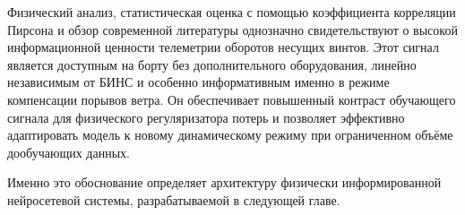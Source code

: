 Физический анализ, статистическая оценка с помощью коэффициента корреляции Пирсона и обзор современной литературы однозначно свидетельствуют о высокой информационной ценности телеметрии оборотов несущих винтов. Этот сигнал является доступным на борту без дополнительного оборудования, линейно независимым от БИНС и особенно информативным именно в режиме компенсации порывов ветра. Он обеспечивает повышенный контраст обучающего сигнала для физического регуляризатора потерь и позволяет эффективно адаптировать модель к новому динамическому режиму при ограниченном объёме дообучающих данных.

Именно это обоснование определяет архитектуру физически информированной нейросетевой системы, разрабатываемой в следующей главе.









